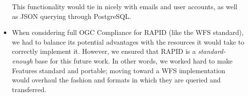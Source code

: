 \begin{itemize}
     This functionality would tie in nicely with emails and user accounts, as well as JSON querying through PostgreSQL.
    
    \item When considering full OGC Compliance for RAPID (like the WFS standard), we had to balance its potential advantages with the resources it would take to correctly implement it. However, we ensured that RAPID is a \textit{standard-enough} base for this future work. In other words, we worked hard to make Features standard and portable; moving toward a WFS implementation would overhaul the fashion and formats in which they are queried and transferred.

\end{itemize}
